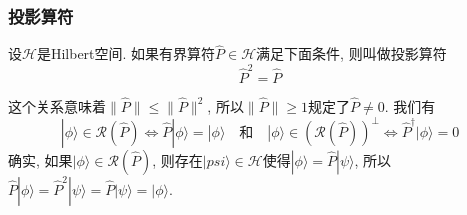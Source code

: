 \documentclass[a4paper,11pt]{article}
\theoremstyle{mystyle}
\begin{document}
\subsubsection{投影算符}
\begin{definition}
  设$\mathcal{H}$是Hilbert空间. 如果有界算符$\hat{P}\in\mathcal{H}$满足下面条件, 则叫做投影算符
\begin{equation*}
  \hat{P}^2=\hat{P}
\end{equation*}
\end{definition}
这个关系意味着$\|\hat{P}\|\leq\|\hat{P}\|^2$, 所以$\|\hat{P}\|\geq1$规定了$\hat{P}\neq
0$. 我们有
\begin{equation}\label{projection operator}
  |\phi\rangle\in\mathcal{R}(\hat{P})\Longleftrightarrow\hat{P}|\phi\rangle=|\phi\rangle\quad\text{和}\quad|\phi\rangle\in(\mathcal{R}(\hat{P}))^{\perp}\Longleftrightarrow\hat{P}^{\dag}|\phi\rangle=0
\end{equation}
确实, 如果$|\phi\rangle\in\mathcal{R}(\hat{P})$, 则存在$|psi\rangle\in\mathcal{H}$使得$|\phi\rangle=\hat{P}|\psi\rangle$, 所以$\hat{P}|\phi\rangle=\hat{P}^2|\psi\rangle=\hat{P}|\psi\rangle=|\phi\rangle$.
\end{document}
